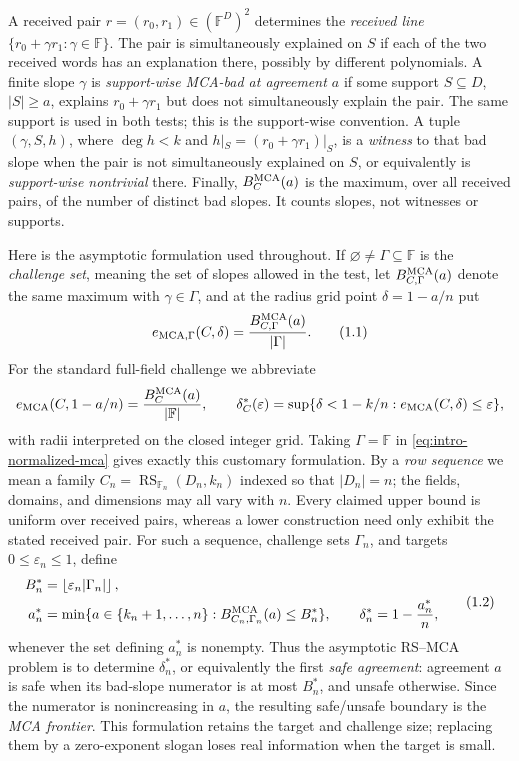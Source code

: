 \documentclass[12pt,a4paper]{amsart}
\numberwithin{equation}{section}
\theoremstyle{remark}
\DeclareMathOperator{\RS}{RS}
\newcommand{\F}{\mathbb F}
\newcommand{\eps}{\varepsilon}
\newcommand{\abs}[1]{\lvert #1\rvert}
\newcommand{\floor}[1]{\left\lfloor #1\right\rfloor}
\begin{document}
A received pair \(r=(r_0,r_1)\in(\F^D)^2\) determines the
\emph{received line} \(\{r_0+\gamma r_1:\gamma\in\F\}\).  The pair is
simultaneously explained on \(S\) if each of the two received words has an explanation
there, possibly by different polynomials.  A finite slope \(\gamma\) is
\emph{support-wise MCA-bad at agreement \(a\)} if some support
\(S\subseteq D\), \(\abs S\ge a\), explains
\(r_0+\gamma r_1\) but does not simultaneously explain the pair.  The
same support is used in both tests; this is the support-wise convention.
A tuple \((\gamma,S,h)\), where \(\deg h<k\) and
\(h|_S=(r_0+\gamma r_1)|_S\), is a \emph{witness} to that bad slope when
the pair is not simultaneously explained on \(S\), or equivalently is
\emph{support-wise nontrivial} there.  Finally,
\(B_C^{\rm MCA}(a)\) is the maximum, over all received pairs, of the
number of distinct bad slopes.  It counts slopes, not witnesses or
supports.

Here is the asymptotic formulation used throughout.  If
\(\varnothing\ne\Gamma\subseteq\F\) is the \emph{challenge set}, meaning
the set of slopes allowed in the test, let
\(B_{C,\Gamma}^{\rm MCA}(a)\) denote the same maximum with
\(\gamma\in\Gamma\), and at the radius grid point \(\delta=1-a/n\) put
\[
 e_{\rm MCA,\Gamma}(C,\delta)
   =\frac{B_{C,\Gamma}^{\rm MCA}(a)}{\abs\Gamma}.
 \tag{1.1}\label{eq:intro-normalized-mca}
\]
For the standard full-field challenge we abbreviate
\[
 e_{\rm MCA}(C,1-a/n)=\frac{B_C^{\rm MCA}(a)}{\abs\F},
 \qquad
 \delta_C^*(\eps)=\sup\{\delta<1-k/n:
                         e_{\rm MCA}(C,\delta)\le\eps\},
\]
with radii interpreted on the closed integer grid.  Taking
\(\Gamma=\F\) in \eqref{eq:intro-normalized-mca} gives exactly this
customary formulation.
By a \emph{row sequence} we mean a family
\(C_n=\RS_{\F_n}(D_n,k_n)\) indexed so that \(\abs{D_n}=n\); the fields,
domains, and dimensions may all vary with \(n\).  Every claimed upper
bound is uniform over received pairs, whereas a lower construction need
only exhibit the stated received pair.  For such a sequence,
challenge sets
\(\Gamma_n\), and targets \(0\le\eps_n\le1\), define
\[
 \begin{split}
 B_n^*&=\floor{\eps_n\abs{\Gamma_n}},\\
 a_n^*&=\min\{a\in\{k_n+1,\ldots,n\}:
              B_{C_n,\Gamma_n}^{\rm MCA}(a)\le B_n^*\},
 \qquad
 \delta_n^*=1-\frac{a_n^*}{n},
 \end{split}
 \tag{1.2}\label{eq:intro-asymptotic-threshold}
\]
whenever the set defining \(a_n^*\) is nonempty.  Thus the asymptotic
RS--MCA problem is to determine \(\delta_n^*\), or equivalently the first
\emph{safe agreement}: agreement \(a\) is safe when its bad-slope
numerator is at most \(B_n^*\), and unsafe otherwise.  Since the numerator
is nonincreasing in \(a\), the resulting safe/unsafe boundary is the
\emph{MCA frontier}.  This formulation retains the target and challenge
size; replacing them by a zero-exponent slogan loses real information when
the target is small.
\end{document}
